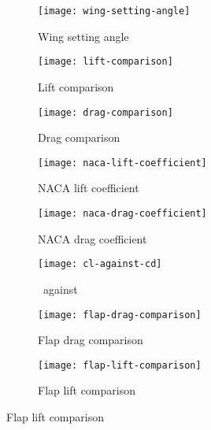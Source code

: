 \documentclass[../../main.tex]{subfiles}
\begin{document}
\begin{figure}[H]
    \centering
    \begin{subfigure}[b]{\multiimagewidth\columnwidth}
        \centering
        \texttt{[image: wing-setting-angle]}
        \caption{Wing setting angle}
        \label{fig:wind-tunnel-results:wing-setting-angle}
    \end{subfigure}
    \begin{subfigure}[b]{\multiimagewidth\columnwidth}
        \centering
        \texttt{[image: lift-comparison]}
        \caption{Lift comparison}
        \label{fig:wind-tunnel-results:lift-comparison}
    \end{subfigure}

    \begin{subfigure}[b]{\multiimagewidth\columnwidth}
        \centering
        \texttt{[image: drag-comparison]}
        \caption{Drag comparison}
        \label{fig:wind-tunnel-results:drag-comparison}
    \end{subfigure}
    \begin{subfigure}[b]{\multiimagewidth\columnwidth}
        \centering
        \texttt{[image: naca-lift-coefficient]}
        \caption{NACA lift coefficient}
        \label{fig:wind-tunnel-results:naca-lift-coefficient}
    \end{subfigure}

    \begin{subfigure}[b]{\multiimagewidth\columnwidth}
        \centering
        \texttt{[image: naca-drag-coefficient]}
        \caption{NACA drag coefficient}
        \label{fig:wind-tunnel-results:naca-drag-coefficient}
    \end{subfigure}
    \begin{subfigure}[b]{\multiimagewidth\columnwidth}
        \centering
        \texttt{[image: cl-against-cd]}
        \caption{\cl\, against \cd}
        \label{fig:wind-tunnel-results:cl-against-cd}
    \end{subfigure}

    \begin{subfigure}[b]{\multiimagewidth\columnwidth}
        \centering
        \texttt{[image: flap-drag-comparison]}
        \caption{Flap drag comparison}
        \label{fig:wind-tunnel-results:flap-drag-comparison}
    \end{subfigure}
    \begin{subfigure}[b]{\multiimagewidth\columnwidth}
        \centering
        \texttt{[image: flap-lift-comparison]}
        \caption{Flap lift comparison}
        \label{fig:wind-tunnel-results:flap-lift-comparison}
    \end{subfigure}


\end{figure}
\end{document}

